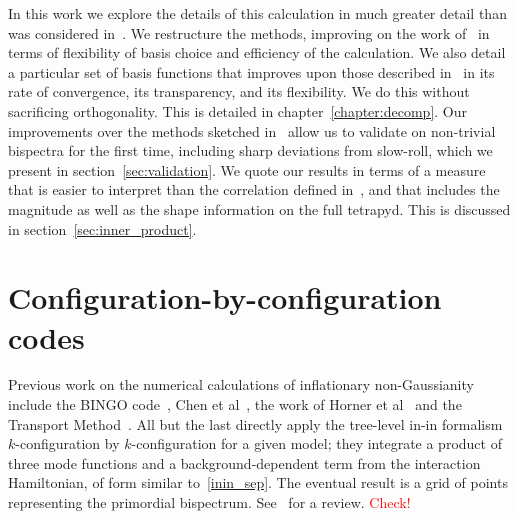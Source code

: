 In this work we explore the details of this calculation in much greater detail
than was considered in~\cite{Funakoshi}.
We restructure the methods, improving on the work of~\cite{Funakoshi} in terms
of flexibility of basis choice and efficiency of the calculation.
We also detail a particular set of basis functions that improves upon those described
in~\cite{Funakoshi} in its rate of convergence, its transparency,
and its flexibility.
We do this without sacrificing orthogonality.
This is detailed in chapter~\ref{chapter:decomp}.
Our improvements over the methods sketched in~\cite{Funakoshi} allow us to validate
on non-trivial bispectra for the first time, including sharp deviations from slow-roll, which we present in
section~\ref{sec:validation}.
We quote our results in terms of a measure that is
easier to interpret than the correlation defined in~\cite{Funakoshi},
and that includes the magnitude as well as the shape information
on the full tetrapyd.
This is discussed in section~\ref{sec:inner_product}.


    \section{Configuration-by-configuration codes}
    Previous work on the numerical calculations of inflationary
non-Gaussianity include the BINGO code~\cite{BINGO},
Chen et al~\cite{chen_easther_lim_1,chen_easther_lim_2},
the work of Horner et al~\cite{horner_methods,horner_ng,horner_cs}
and the Transport Method~\cite{transport_main,transport_pytransport,transport_pytransport_2,transport_curved_3_point}.
All but the last directly apply the tree-level in-in formalism $k$-configuration by $k$-configuration for a given model;
they integrate a product of three mode functions and a background-dependent term from the interaction Hamiltonian, of form similar to~\eqref{inin_sep}.
The eventual result is a grid of points representing the primordial bispectrum.
See~\cite{Ringeval} for a review. \textcolor{red}{Check!}


